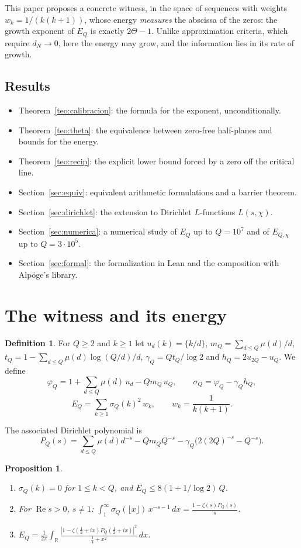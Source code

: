\documentclass[11pt,a4paper]{amsart}
\newtheorem{proposition}[theorem]{Proposition}
\theoremstyle{definition}
\newtheorem{definition}[theorem]{Definition}
\theoremstyle{remark}
\renewcommand{\Re}{\operatorname{Re}}
\begin{document}
This paper proposes a concrete witness, in the space of sequences with weights $w_k=1/(k(k+1))$, whose energy \emph{measures} the abscissa of the zeros: the growth exponent of $E_Q$ is exactly $2\Theta-1$. Unlike approximation criteria, which require $d_N\to0$, here the energy may grow, and the information lies in its rate of growth.

\subsection*{Results}
\begin{itemize}
\item Theorem~\ref{teo:calibracion}: the formula for the exponent, unconditionally.
\item Theorem~\ref{teo:theta}: the equivalence between zero-free half-planes and bounds for the energy.
\item Theorem~\ref{teo:recip}: the explicit lower bound forced by a zero off the critical line.
\item Section~\ref{sec:equiv}: equivalent arithmetic formulations and a barrier theorem.
\item Section~\ref{sec:dirichlet}: the extension to Dirichlet $L$-functions $L(s,\chi)$.
\item Section~\ref{sec:numerica}: a numerical study of $E_Q$ up to $Q=10^7$ and of $E_{Q,\chi}$ up to $Q=3\cdot10^5$.
\item Section~\ref{sec:formal}: the formalization in Lean and the composition with Alp\"oge's library.
\end{itemize}

\section{The witness and its energy}

\begin{definition}
For $Q\ge2$ and $k\ge1$ let $u_d(k)=\{k/d\}$, $m_Q=\sum_{d\le Q}\mu(d)/d$, $t_Q=1-\sum_{d\le Q}\mu(d)\log(Q/d)/d$, $\gamma_Q=Qt_Q/\log2$ and $h_Q=2u_{2Q}-u_Q$. We define
\[
\varphi_Q=1+\sum_{d\le Q}\mu(d)\,u_d-Qm_Q\,u_Q,\qquad
\sigma_Q=\varphi_Q-\gamma_Q h_Q,
\]
\[
E_Q=\sum_{k\ge1}\sigma_Q(k)^2\,w_k,\qquad w_k=\frac1{k(k+1)}.
\]
\end{definition}

The associated Dirichlet polynomial is
\[
P_Q(s)=\sum_{d\le Q}\mu(d)d^{-s}-Qm_QQ^{-s}-\gamma_Q\bigl(2(2Q)^{-s}-Q^{-s}\bigr).
\]

\begin{proposition}\label{prop:mellin}
\begin{enumerate}
\item $\sigma_Q(k)=0$ for $1\le k<Q$, and $E_Q\le 8(1+1/\log2)\,Q$.
\item For $\Re s>0$, $s\ne1$: $\displaystyle\int_1^\infty\sigma_Q(\lfloor x\rfloor)\,x^{-s-1}\,dx=\frac{1-\zeta(s)P_Q(s)}{s}$.
\item $\displaystyle E_Q=\frac1{2\pi}\int_{\mathbb R}\frac{|1-\zeta(\tfrac12+ix)P_Q(\tfrac12+ix)|^2}{\tfrac14+x^2}\,dx$.
\end{enumerate}
\end{proposition}
\end{document}
